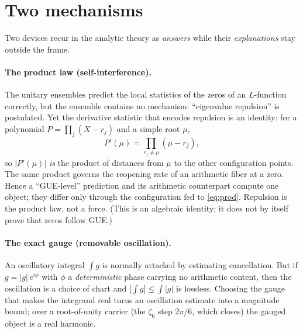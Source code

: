 \documentclass[11pt]{article}
\theoremstyle{definition}
\begin{document}
\tableofcontents

\section{Two mechanisms}\label{sec:two}

Two devices recur in the analytic theory as \emph{answers} while their \emph{explanations} stay
outside the frame.

\paragraph{The product law (self-interference).} The unitary ensembles predict the local statistics
of the zeros of an $L$-function correctly, but the ensemble contains no mechanism: ``eigenvalue repulsion'' is
postulated. Yet the derivative statistic that encodes repulsion is an identity: for a polynomial
$P=\prod_j(X-r_j)$ and a simple root $\mu$,
\begin{equation}\label{eq:prod}
  P'(\mu)=\prod_{r_j\neq\mu}(\mu-r_j),
\end{equation}
so $|P'(\mu)|$ \emph{is} the product of distances from $\mu$ to the other configuration points. The
same product governs the reopening rate of an arithmetic fiber at a zero. Hence a ``GUE-level''
prediction and its arithmetic counterpart compute one object; they differ only through the
configuration fed to \eqref{eq:prod}. Repulsion is the product law, not a force. (This is an
algebraic identity; it does not by itself prove that zeros follow GUE.)

\paragraph{The exact gauge (removable oscillation).} An oscillatory integral $\int g$ is normally
attacked by estimating cancellation. But if $g=|g|\,e^{i\phi}$ with $\phi$ a \emph{deterministic}
phase carrying no arithmetic content, then the oscillation is a choice of chart and
$|\int g|\le\int|g|$ is lossless. Choosing the gauge that makes the integrand real turns an
oscillation estimate into a magnitude bound; over a root-of-unity carrier (the $\zeta_6$ step
$2\pi/6$, which closes) the gauged object is a real harmonic.
\end{document}
